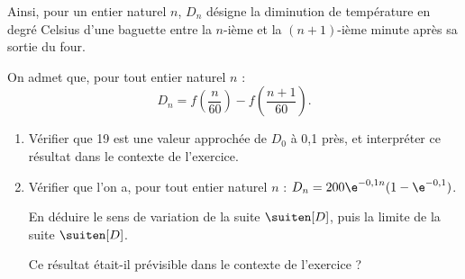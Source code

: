 \begin{enumerate}
	Ainsi, pour un entier naturel $n$, $D_n$ désigne la diminution de température en degré Celsius d’une baguette entre la $n$-ième et la $(n+1)$-ième minute après sa sortie du four.
	
	On admet que, pour tout entier naturel $n$ : \[ D_n=f\left(\dfrac{n}{60}\right) - f\left(\dfrac{n+1}{60}\right).\]
	\begin{enumerate}
		\item Vérifier que 19 est une valeur approchée de $D_0$ à 0,1 près, et interpréter ce résultat dans le contexte de l’exercice.
		\item  Vérifier que l’on a, pour tout entier naturel $n$ : $D_n = 200\e^{-0,1n}(1 - \e^{-0,1})$.
		
		En déduire le sens de variation de la suite $\suiten[D]$, puis la limite de la suite $\suiten[D]$.
		
		Ce résultat était-il prévisible dans le contexte de l’exercice ?
	\end{enumerate}
\end{enumerate}